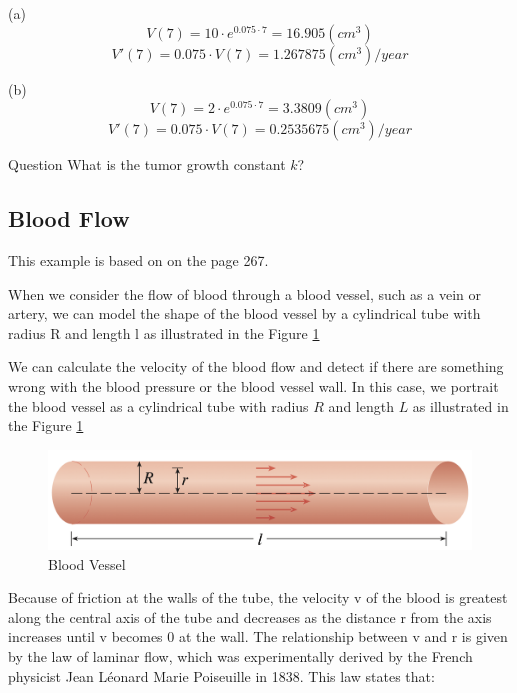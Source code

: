 (a) 
$$
V(7) = 10 \cdot e^{0.075 \cdot 7} = 16.905(cm^3)
$$
$$
V'(7) = 0.075 \cdot V(7) = 1.267875(cm^3)/year
$$

(b)
$$
V(7) = 2 \cdot e^{0.075 \cdot 7} = 3.3809(cm^3)
$$
$$
V'(7) = 0.075 \cdot V(7) = 0.2535675(cm^3)/year
$$

\begin{mybox}{Question}
What is the tumor growth constant $k$?
\end{mybox}

\subsection{Blood Flow}
This example is based on \cite{calculus} on the page 267.

When we consider the flow of blood through a blood vessel, such as a vein or artery, we can model the shape of the blood vessel by a cylindrical tube with radius R and length l as illustrated in the Figure \ref{fig:Fig6}

\begin{flushleft}
We can calculate the velocity of the blood flow and detect if there are something wrong with the blood pressure or the blood vessel wall.
In this case, we portrait the blood vessel as a cylindrical tube with radius $R$ and length $L$ as illustrated in the Figure \ref{fig:Fig6}
\end{flushleft}

\begin{figure}[h]
    \centering
    \includegraphics[scale=0.4]{chapter001/figures/fig006}
    \caption{Blood Vessel}
    \label{fig:Fig6}
\end{figure}

\begin{flushleft}
	Because of friction at the walls of the tube, the velocity v of the blood is greatest along the central axis of the tube and decreases as the distance r from the axis increases until v becomes 0 at the wall. The relationship between v and r is given by the law of laminar flow, which was experimentally derived by the French physicist Jean Léonard Marie Poiseuille in 1838. This law states that:
\end{flushleft}

